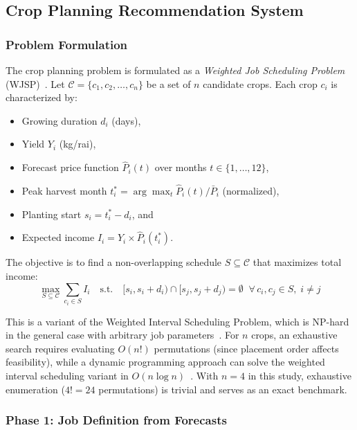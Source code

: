 \documentclass[journal]{IEEEtran}
\begin{document}
\subsection{Crop Planning Recommendation System}

\subsubsection{Problem Formulation}

The crop planning problem is formulated as a \textit{Weighted Job Scheduling Problem} (WJSP)~\cite{clrs2009, kleinberg2005}. Let $\mathcal{C} = \{c_1, c_2, \ldots, c_n\}$ be a set of $n$ candidate crops. Each crop $c_i$ is characterized by:
\begin{itemize}
  \item Growing duration $d_i$ (days),
  \item Yield $Y_i$ (kg/rai),
  \item Forecast price function $\hat{P}_i(t)$ over months $t \in \{1, \ldots, 12\}$,
  \item Peak harvest month $t_i^* = \arg\max_t \hat{P}_i(t) / \bar{P}_i$ (normalized),
  \item Planting start $s_i = t_i^* - d_i$, and
  \item Expected income $I_i = Y_i \times \hat{P}_i(t_i^*)$.
\end{itemize}

The objective is to find a non-overlapping schedule $S \subseteq \mathcal{C}$ that maximizes total income:
\begin{equation}
  \max_{S \subseteq \mathcal{C}} \sum_{c_i \in S} I_i \quad \text{s.t.} \quad [s_i, s_i + d_i) \cap [s_j, s_j + d_j) = \emptyset \;\; \forall\, c_i, c_j \in S,\; i \neq j
\end{equation}

This is a variant of the Weighted Interval Scheduling Problem, which is NP-hard in the general case with arbitrary job parameters~\cite{clrs2009}. For $n$ crops, an exhaustive search requires evaluating $O(n!)$ permutations (since placement order affects feasibility), while a dynamic programming approach can solve the weighted interval scheduling variant in $O(n \log n)$~\cite{kleinberg2005}. With $n = 4$ in this study, exhaustive enumeration ($4! = 24$ permutations) is trivial and serves as an exact benchmark.

\subsubsection{Phase 1: Job Definition from Forecasts}
\end{document}
